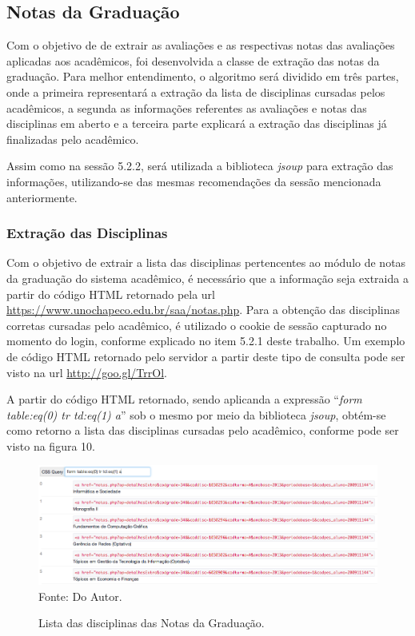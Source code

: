 \subsection{Notas da Graduação}
Com o objetivo de de extrair as avaliações e as respectivas notas das avaliações aplicadas aos acadêmicos, foi desenvolvida a classe de extração das notas da graduação. Para melhor entendimento, o algoritmo será dividido em três partes, onde a primeira representará a extração da lista de disciplinas cursadas pelos acadêmicos, a segunda as informações referentes as avaliações e notas das disciplinas em aberto e a terceira parte explicará a extração das disciplinas já finalizadas pelo acadêmico.

Assim como na sessão 5.2.2, será utilizada a biblioteca \emph{jsoup} para extração das informações, utilizando-se das mesmas recomendações da sessão mencionada anteriormente.

\subsubsection{Extração das Disciplinas}
Com o objetivo de extrair a lista das disciplinas pertencentes ao módulo de notas da graduação do sistema acadêmico, é necessário que a informação seja extraida a partir do código HTML retornado pela url \url{https://www.unochapeco.edu.br/saa/notas.php}. Para a obtenção das disciplinas corretas cursadas pelo acadêmico, é utilizado o cookie de sessão capturado no momento do login, conforme explicado no item 5.2.1 deste trabalho. Um exemplo de código HTML retornado pelo servidor a partir deste tipo de consulta pode ser visto na url \url{http://goo.gl/TrrOl}.

A partir do código HTML retornado, sendo aplicanda a expressão ``\emph{form table:eq(0) tr td:eq(1) a}'' sob o mesmo por meio da biblioteca \emph{jsoup}, obtém-se como retorno a lista das disciplinas cursadas pelo acadêmico, conforme pode ser visto na figura 10.

\begin{figure}[!htb]
     \centering
     \caption[Extração de Informações - Lista das disciplinas Notas da Graduação]{Lista das disciplinas das Notas da Graduação.}
     \includegraphics[scale=0.45]{imagens/listadisciplinasnotasgraduacao.png}
     \\  Fonte: Do Autor.
\end{figure}

